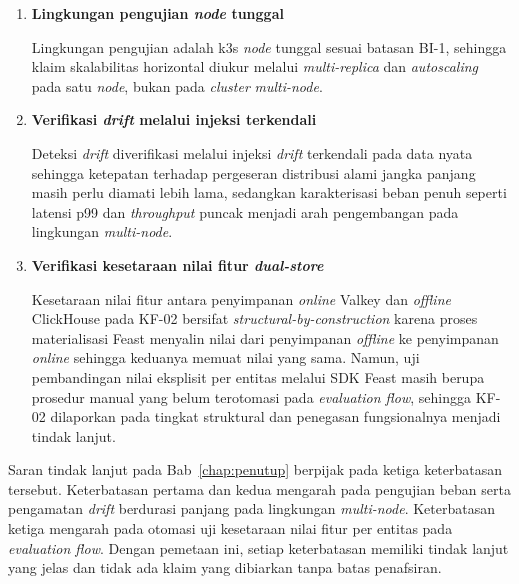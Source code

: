 \vspace{0.5em}
\begin{enumerate}
    \item \textbf{Lingkungan pengujian \textit{node} tunggal}

    Lingkungan pengujian adalah k3s \textit{node} tunggal sesuai batasan BI-1, sehingga klaim skalabilitas horizontal diukur melalui \textit{multi-replica} dan \textit{autoscaling} pada satu \textit{node}, bukan pada \textit{cluster} \textit{multi-node}.

    \vspace{0.5em}

    \item \textbf{Verifikasi \textit{drift} melalui injeksi terkendali}

    Deteksi \textit{drift} diverifikasi melalui injeksi \textit{drift} terkendali pada data nyata sehingga ketepatan terhadap pergeseran distribusi alami jangka panjang masih perlu diamati lebih lama, sedangkan karakterisasi beban penuh seperti latensi p99 dan \textit{throughput} puncak menjadi arah pengembangan pada lingkungan \textit{multi-node}.

    \vspace{0.5em}

    \item \textbf{Verifikasi kesetaraan nilai fitur \textit{dual-store}}

    Kesetaraan nilai fitur antara penyimpanan \textit{online} Valkey dan \textit{offline} ClickHouse pada KF-02 bersifat \textit{structural-by-construction} karena proses materialisasi Feast menyalin nilai dari penyimpanan \textit{offline} ke penyimpanan \textit{online} sehingga keduanya memuat nilai yang sama. Namun, uji pembandingan nilai eksplisit per entitas melalui SDK Feast masih berupa prosedur manual yang belum terotomasi pada \textit{evaluation flow}, sehingga KF-02 dilaporkan pada tingkat struktural dan penegasan fungsionalnya menjadi tindak lanjut.
\end{enumerate}

Saran tindak lanjut pada Bab~\ref{chap:penutup} berpijak pada ketiga keterbatasan tersebut. Keterbatasan pertama dan kedua mengarah pada pengujian beban serta pengamatan \textit{drift} berdurasi panjang pada lingkungan \textit{multi-node}. Keterbatasan ketiga mengarah pada otomasi uji kesetaraan nilai fitur per entitas pada \textit{evaluation flow}. Dengan pemetaan ini, setiap keterbatasan memiliki tindak lanjut yang jelas dan tidak ada klaim yang dibiarkan tanpa batas penafsiran.

